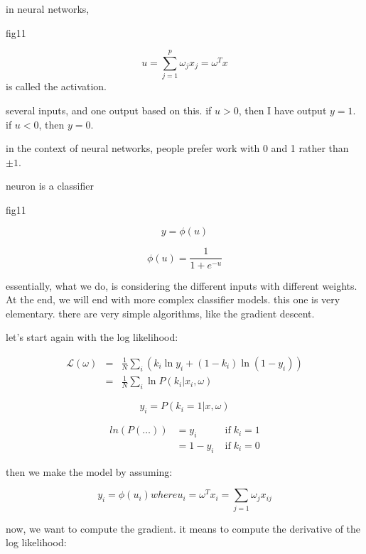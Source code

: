 \documentclass[a4paper]{tufte-book}
\begin{document}
in neural networks,

fig11

\begin{equation}
    u = \sum_{j=1}^p \omega_j x_j = \omega^T x 
\end{equation}
is called the activation.

several inputs, and one output based on this.
if $u>0$, then I have output $y=1$.
if $u<0$, then $y=0$.

in the context of neural networks, people prefer work with 0 and 1 rather than
$\pm 1$.

neuron is a classifier

fig11

\begin{equation}
    y = \phi (u)
\end{equation}

\begin{equation}
    \phi (u) = \frac{1}{1+e^{-u}}
\end{equation}

essentially, what we do, is considering the different inputs with different
weights.
At the end, we will end with more complex classifier models. this one is very
elementary.
there are very simple algorithms, like the gradient descent.


let's start again with the log likelihood:

\begin{eqnarray}
    \mathcal{L}(\omega) & = & \frac{1}{N} \sum_i (k_i \ln y_i + (1-k_i) \ln(1-y_i))\\
    & = & \frac{1}{N} \sum_i \ln P (k_i | x_i,\omega)
\end{eqnarray}

\begin{equation}
    y_i = P(k_i =1 |x,\omega)
\end{equation}

\begin{eqnarray}
    ln(P(\ldots)) & = y_i & \;\text{if}\; k_i = 1 \\
    & = 1-y_i & \;\text{if}\; k_i = 0
\end{eqnarray}

then we make the model by assuming:

\begin{equation}
    y_i = \phi (u_i) where u_i = \omega^T x_i = \sum_{j=1} \omega_j x_{ij}
\end{equation}

now, we want to compute the gradient.
it means to compute the derivative of the log likelihood:
\end{document}
